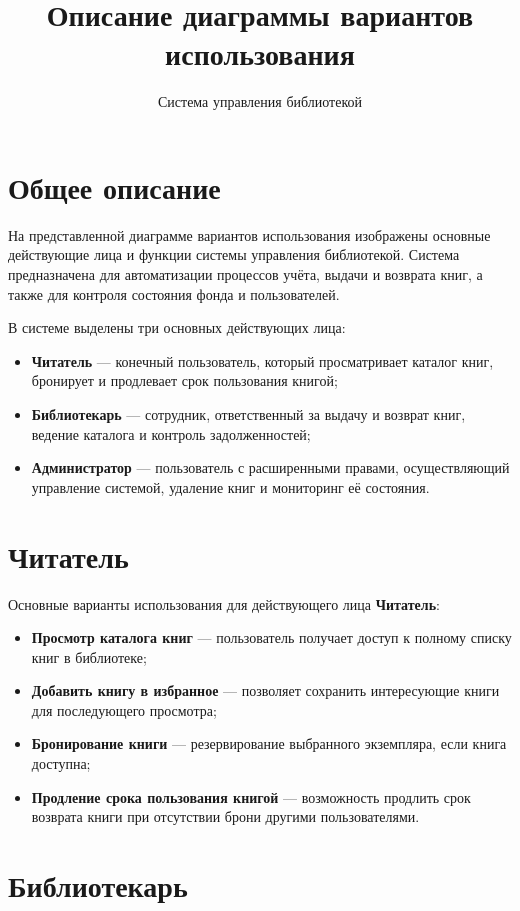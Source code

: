 \documentclass[a4paper,12pt]{article}
\title{Описание диаграммы вариантов использования}
\author{Система управления библиотекой}
\date{}
\begin{document}
\maketitle

\section{Общее описание}

На представленной диаграмме вариантов использования изображены основные действующие лица и функции системы управления библиотекой. 
Система предназначена для автоматизации процессов учёта, выдачи и возврата книг, а также для контроля состояния фонда и пользователей.

В системе выделены три основных действующих лица:
\begin{itemize}
    \item \textbf{Читатель} — конечный пользователь, который просматривает каталог книг, бронирует и продлевает срок пользования книгой;
    \item \textbf{Библиотекарь} — сотрудник, ответственный за выдачу и возврат книг, ведение каталога и контроль задолженностей;
    \item \textbf{Администратор} — пользователь с расширенными правами, осуществляющий управление системой, удаление книг и мониторинг её состояния.
\end{itemize}

\section{Читатель}

Основные варианты использования для действующего лица \textbf{Читатель}:
\begin{itemize}[noitemsep]
    \item \textbf{Просмотр каталога книг} — пользователь получает доступ к полному списку книг в библиотеке;
    \item \textbf{Добавить книгу в избранное} — позволяет сохранить интересующие книги для последующего просмотра;
    \item \textbf{Бронирование книги} — резервирование выбранного экземпляра, если книга доступна;
    \item \textbf{Продление срока пользования книгой} — возможность продлить срок возврата книги при отсутствии брони другими пользователями.
\end{itemize}

\section{Библиотекарь}
\end{document}

